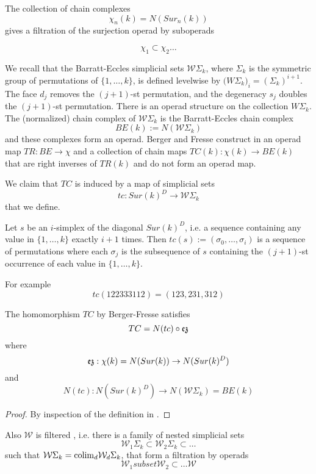 The collection of chain complexes 
$$\chi_n(k)=N(Sur_n(k))$$ 
gives a filtration of the surjection operad by suboperads

$$\chi_1 \subset \chi_2 \dots $$





We recall that the Barratt-Eccles simplicial sets $\mathcal{W}\Sigma_k$, where  $\Sigma_k$ is the symmetric group of permutations of $\{1,\dots,k\}$, is defined levelwise by
$\mathcal({W}\Sigma_k)_i=(\Sigma_k)^{i+1}$. The face $d_{j}$ removes the $(j+1)$-st permutation, and the degeneracy $s_j$ doubles the $(j+1)$-st permutation. There is an operad structure on the collection $W\Sigma_k$.
The (normalized) chain complex of $\mathcal{W}\Sigma_k$ is the Barratt-Eccles chain complex $$BE(k):=N(\mathcal{W}\Sigma_k)$$
and these complexes form an operad.
Berger and Fresse construct in \cite{BFsmall} 
  an operad map $TR:BE \to \chi$
and a collection of
chain maps $TC(k):\chi(k) \to BE(k)$
that are right inverses of $TR(k)$ and do not form an operad map.

We claim that $TC$ is induced by a map of simplicial sets
$$tc: Sur(k)^D \to \mathcal{W}\Sigma_k$$ that we define. 
\begin{definition}
Let $s$ be an $i$-simplex  of the diagonal $Sur(k)^D$, i.e. a sequence containing any value in $\{1,\dots,k\}$ exactly $i+1$ times. 
Then $tc(s):=(\sigma_0,\dots,\sigma_i)$ is a sequence of permutations where each $\sigma_j$ is the subsequence of $s$ containing the $(j+1)$-st occurrence of each value in $\{1,\dots,k\}$.
 \end{definition}

 For example 
 $$tc(122333112)=(123,231,312)$$

\begin{proposition} 
The homomorphism $TC$ by Berger-Fresse satisfies
$$TC=N(tc) \circ \operatorname{\mathfrak{ez}}$$ where
$$\operatorname{\mathfrak{ez}}: \chi(k) = N(Sur(k)) \to N(Sur(k)^D)$$ and $$N(tc):N(Sur(k)^D) \to N(\mathcal{W}\Sigma_k)=BE(k)$$
\end{proposition}

\begin{proof}
By inspection of the definition in \cite{BFsmall}. %
\end{proof}

Also $\mathcal{W}$ is filtered \cite{BFsmall}, i.e.
there is a family of nested simplicial sets $$\mathcal{W}_1\Sigma_k \subset \mathcal{W}_2 \Sigma_k
 \subset \dots $$ such that 
$\mathcal{W}\Sigma_k={\rm colim}_d \mathcal{W}_d\Sigma_k$, that form a filtration by operads 
$$\mathcal{W}_1 subset \mathcal{W}_2 \subset \dots \mathcal{W}$$


